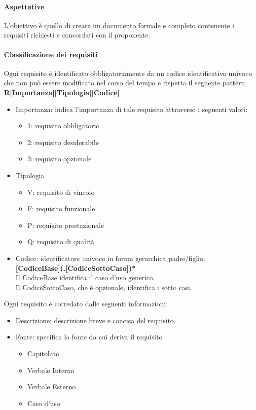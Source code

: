 \paragraph{Aspettative}
L'obiettivo è quello di creare un documento formale e completo contenente i requisiti richiesti e concordati con il proponente.
\paragraph{Classificazione dei requisiti}
Ogni requisito è identificato obbligatoriamente da un codice identificativo univoco che non può essere modificato nel corso del tempo e rispetta il seguente pattern: \\
\textbf{R[Importanza][Tipologia][Codice]}
  
\begin{itemize}
  \item Importanza: indica l'importanza di tale requisito attraverso i seguenti valori:
  \begin{itemize}
  	\item 1: requisito obbligatorio
  	\item 2: requisito desiderabile
  	\item 3: requisito opzionale
  \end{itemize}
  \item Tipologia
  \begin{itemize}
  	\item V: requisito di vincolo
  	\item F: requisito funzionale
  	\item P: requisito prestazionale
  	\item Q: requisito di qualità
  \end{itemize}
  \item Codice: identificatore univoco in forma gerarchica padre/figlio. \\
\textbf{[CodiceBase](.[CodiceSottoCaso])*} \\
  
  Il CodiceBase identifica il caso d'uso generico. \\
  Il CodiceSottoCaso, che è opzionale, identifica i sotto casi.
\end{itemize}

Ogni requisito è corredato dalle seguenti informazioni:
\begin{itemize}
	\item Descrizione: descrizione breve e concisa del requisito.
	\item Fonte: specifica la fonte da cui deriva il requisito
	\begin{itemize}
		\item Capitolato
		\item Verbale Interno
		\item Verbale Esterno
		\item Caso d'uso
	\end{itemize}
\end{itemize}

